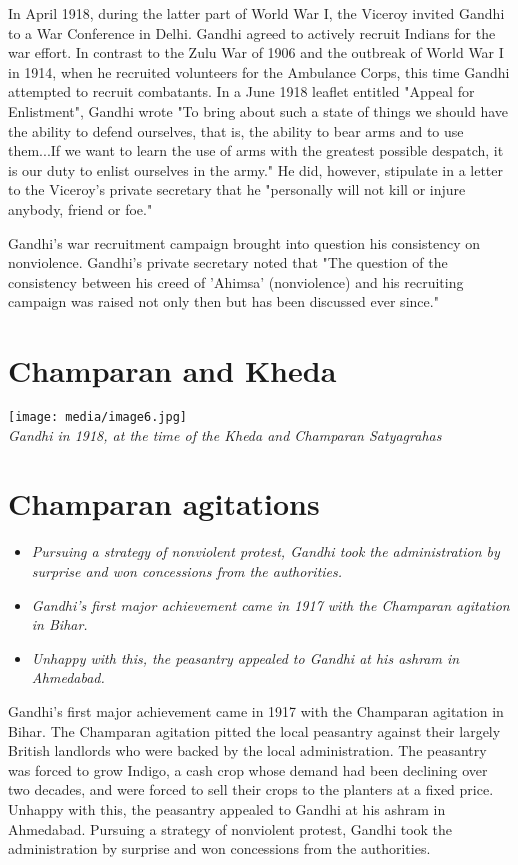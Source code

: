 In April 1918, during the latter part of World War I, the Viceroy
invited Gandhi to a War Conference in Delhi. Gandhi agreed to actively
recruit Indians for the war effort. In contrast to the Zulu War of 1906
and the outbreak of World War I in 1914, when he recruited volunteers
for the Ambulance Corps, this time Gandhi attempted to recruit
combatants. In a June 1918 leaflet entitled "Appeal for Enlistment",
Gandhi wrote "To bring about such a state of things we should have the
ability to defend ourselves, that is, the ability to bear arms and to
use them...If we want to learn the use of arms with the greatest
possible despatch, it is our duty to enlist ourselves in the army." He
did, however, stipulate in a letter to the Viceroy's private secretary
that he "personally will not kill or injure anybody, friend or foe."

Gandhi's war recruitment campaign brought into question his consistency
on nonviolence. Gandhi's private secretary noted that "The question of
the consistency between his creed of 'Ahimsa' (nonviolence) and his
recruiting campaign was raised not only then but has been discussed ever
since."

\section{Champaran and Kheda}\label{champaran-and-kheda}

\texttt{[image: media/image6.jpg]}\\
\emph{Gandhi in 1918, at the time of the Kheda and Champaran
Satyagrahas}

\section{Champaran agitations}\label{champaran-agitations}

\begin{itemize}
\item
  \emph{Pursuing a strategy of nonviolent protest, Gandhi took the
  administration by surprise and won concessions from the authorities.}
\item
  \emph{Gandhi's first major achievement came in 1917 with the Champaran
  agitation in Bihar.}
\item
  \emph{Unhappy with this, the peasantry appealed to Gandhi at his
  ashram in Ahmedabad.}
\end{itemize}

Gandhi's first major achievement came in 1917 with the Champaran
agitation in Bihar. The Champaran agitation pitted the local peasantry
against their largely British landlords who were backed by the local
administration. The peasantry was forced to grow Indigo, a cash crop
whose demand had been declining over two decades, and were forced to
sell their crops to the planters at a fixed price. Unhappy with this,
the peasantry appealed to Gandhi at his ashram in Ahmedabad. Pursuing a
strategy of nonviolent protest, Gandhi took the administration by
surprise and won concessions from the authorities.

